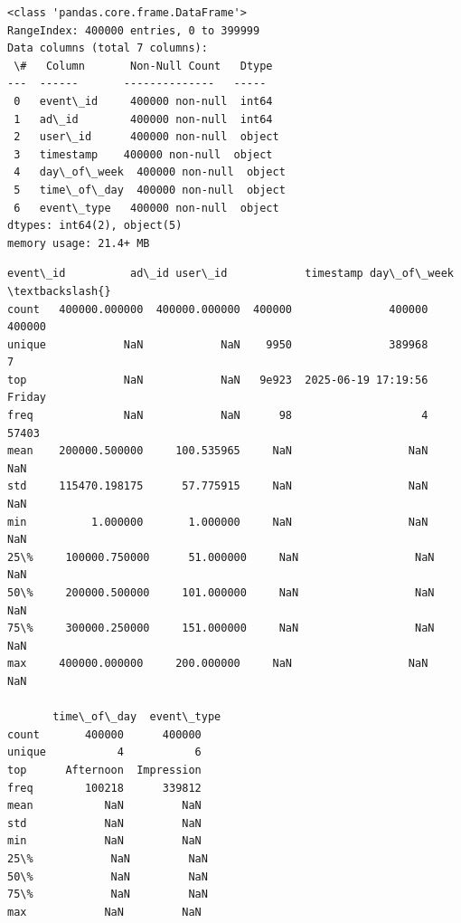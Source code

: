 \documentclass[11pt]{article}
\makeatletter
\newcommand{\boxspacing}{\kern\kvtcb@left@rule\kern\kvtcb@boxsep}
\newcommand{\prompt}[4]{
        {\ttfamily\llap{{\color{#2}[#3]:\hspace{3pt}#4}}\vspace{-\baselineskip}}
    }
\makeatother
\begin{document}
    \begin{Verbatim}[commandchars=\\\{\}]
<class 'pandas.core.frame.DataFrame'>
RangeIndex: 400000 entries, 0 to 399999
Data columns (total 7 columns):
 \#   Column       Non-Null Count   Dtype
---  ------       --------------   -----
 0   event\_id     400000 non-null  int64
 1   ad\_id        400000 non-null  int64
 2   user\_id      400000 non-null  object
 3   timestamp    400000 non-null  object
 4   day\_of\_week  400000 non-null  object
 5   time\_of\_day  400000 non-null  object
 6   event\_type   400000 non-null  object
dtypes: int64(2), object(5)
memory usage: 21.4+ MB
    \end{Verbatim}

            \begin{tcolorbox}[breakable, size=fbox, boxrule=.5pt, pad at break*=1mm, opacityfill=0]
\prompt{Out}{outcolor}{2}{\boxspacing}
\begin{Verbatim}[commandchars=\\\{\}]
             event\_id          ad\_id user\_id            timestamp day\_of\_week  \textbackslash{}
count   400000.000000  400000.000000  400000               400000      400000
unique            NaN            NaN    9950               389968           7
top               NaN            NaN   9e923  2025-06-19 17:19:56      Friday
freq              NaN            NaN      98                    4       57403
mean    200000.500000     100.535965     NaN                  NaN         NaN
std     115470.198175      57.775915     NaN                  NaN         NaN
min          1.000000       1.000000     NaN                  NaN         NaN
25\%     100000.750000      51.000000     NaN                  NaN         NaN
50\%     200000.500000     101.000000     NaN                  NaN         NaN
75\%     300000.250000     151.000000     NaN                  NaN         NaN
max     400000.000000     200.000000     NaN                  NaN         NaN

       time\_of\_day  event\_type
count       400000      400000
unique           4           6
top      Afternoon  Impression
freq        100218      339812
mean           NaN         NaN
std            NaN         NaN
min            NaN         NaN
25\%            NaN         NaN
50\%            NaN         NaN
75\%            NaN         NaN
max            NaN         NaN
\end{Verbatim}
\end{tcolorbox}
        
\end{document}
